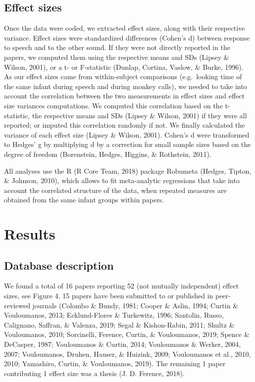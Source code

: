 \documentclass[man]{apa6}
\begin{document}
\subsection{Effect sizes}\label{effect-sizes}

Once the data were coded, we extracted effect sizes, along with their
respective variance. Effect sizes were standardized differences (Cohen's
d) between response to speech and to the other sound. If they were not
directly reported in the papers, we computed them using the respective
means and SDs (Lipsey \& Wilson, 2001), or a t- or F-statistic (Dunlap,
Cortina, Vaslow, \& Burke, 1996). As our effect sizes came from
within-subject comparisons (e.g.~looking time of the same infant during
speech and during monkey calls), we needed to take into account the
correlation between the two measurements in effect sizes and effect size
variances computations. We computed this correlation based on the
t-statistic, the respective means and SDs (Lipsey \& Wilson, 2001) if
they were all reported; or imputed this correlation randomly if not. We
finally calculated the variance of each effect size (Lipsey \& Wilson,
2001). Cohen's d were transformed to Hedges' g by multiplying d by a
correction for small sample sizes based on the degree of freedom
(Borenstein, Hedges, Higgins, \& Rothstein, 2011).

All analyses use the R (R Core Team, 2018) package Robumeta (Hedges,
Tipton, \& Johnson, 2010), which allows to fit meta-analytic regressions
that take into account the correlated structure of the data, when
repeated measures are obtained from the same infant groups within
papers.

\section{Results}\label{results}

\subsection{Database description}\label{database-description}

We found a total of 16 papers reporting 52 (not mutually independent)
effect sizes, see Figure 4. 15 papers have been submitted to or
published in peer-reviewed journals (Colombo \& Bundy, 1981; Cooper \&
Aslin, 1994; Curtin \& Vouloumanos, 2013; Ecklund-Flores \& Turkewitz,
1996; Santolin, Russo, Calignano, Saffran, \& Valenza, 2019; Segal \&
Kishon-Rabin, 2011; Shultz \& Vouloumanos, 2010; Sorcinelli, Ference,
Curtin, \& Vouloumanos, 2019; Spence \& DeCasper, 1987; Vouloumanos \&
Curtin, 2014; Vouloumanos \& Werker, 2004, 2007; Vouloumanos, Druhen,
Hauser, \& Huizink, 2009; Vouloumanos et al., 2010, 2010; Yamashiro,
Curtin, \& Vouloumanos, 2019). The remaining 1 paper contributing 1
effect size was a thesis (J. D. Ference, 2018).
\end{document}
